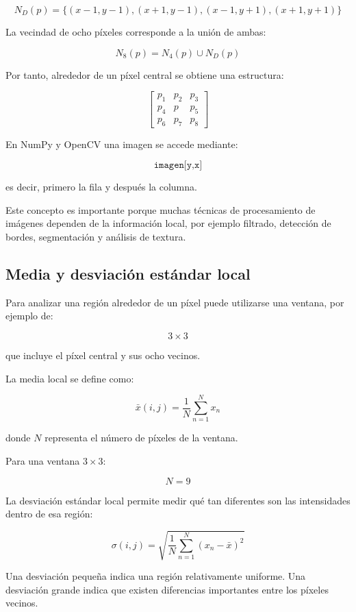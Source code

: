 \documentclass[11pt,letterpaper]{article}
\begin{document}
\[
N_D(p)=
\{
(x-1,y-1),
(x+1,y-1),
(x-1,y+1),
(x+1,y+1)
\}
\]

La vecindad de ocho píxeles corresponde a la unión de ambas:

\[
N_8(p)=N_4(p)\cup N_D(p)
\]

Por tanto, alrededor de un píxel central se obtiene una estructura:

\[
\begin{bmatrix}
p_1 & p_2 & p_3\\
p_4 & p   & p_5\\
p_6 & p_7 & p_8
\end{bmatrix}
\]

En NumPy y OpenCV una imagen se accede mediante:

\[
\texttt{imagen[y,x]}
\]

es decir, primero la fila y después la columna.

Este concepto es importante porque muchas técnicas de procesamiento de imágenes dependen de la información local, por ejemplo filtrado, detección de bordes, segmentación y análisis de textura.


\subsection{Media y desviación estándar local}

Para analizar una región alrededor de un píxel puede utilizarse una ventana, por ejemplo de:

\[
3\times3
\]

que incluye el píxel central y sus ocho vecinos.

La media local se define como:

\[
\bar{x}(i,j)=
\frac{1}{N}
\sum_{n=1}^{N}x_n
\]

donde $N$ representa el número de píxeles de la ventana.

Para una ventana $3\times3$:

\[
N=9
\]

La desviación estándar local permite medir qué tan diferentes son las intensidades dentro de esa región:

\[
\sigma(i,j)
=
\sqrt{
\frac{1}{N}
\sum_{n=1}^{N}
(x_n-\bar{x})^2
}
\]

Una desviación pequeña indica una región relativamente uniforme. Una desviación grande indica que existen diferencias importantes entre los píxeles vecinos.


\end{document}
